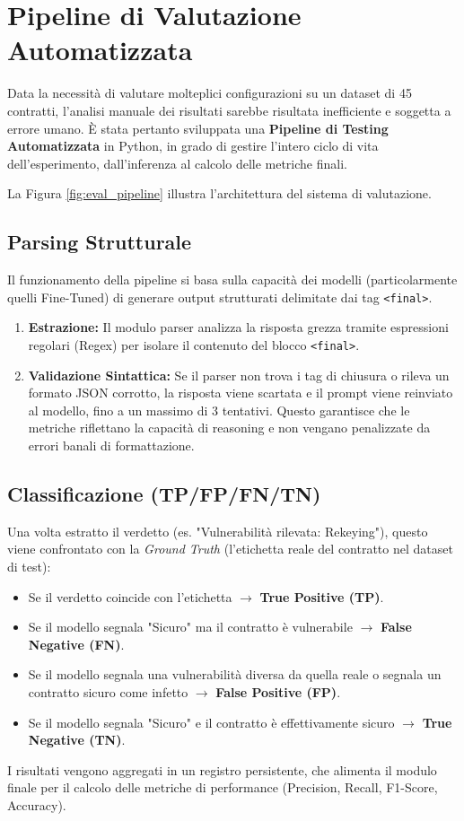 \section{Pipeline di Valutazione Automatizzata}
\label{sec:eval_pipeline}

Data la necessità di valutare molteplici configurazioni su un dataset di 45 contratti, l'analisi manuale dei risultati sarebbe risultata inefficiente e soggetta a errore umano. È stata pertanto sviluppata una \textbf{Pipeline di Testing Automatizzata} in Python, in grado di gestire l'intero ciclo di vita dell'esperimento, dall'inferenza al calcolo delle metriche finali.

La Figura \ref{fig:eval_pipeline} illustra l'architettura del sistema di valutazione.

\subsection{Parsing Strutturale}
Il funzionamento della pipeline si basa sulla capacità dei modelli (particolarmente quelli Fine-Tuned) di generare output strutturati delimitate dai tag \texttt{<final>}.
\begin{enumerate}
    \item \textbf{Estrazione:} Il modulo parser analizza la risposta grezza tramite espressioni regolari (Regex) per isolare il contenuto del blocco \texttt{<final>}.
    \item \textbf{Validazione Sintattica:} Se il parser non trova i tag di chiusura o rileva un formato JSON corrotto, la risposta viene scartata e il prompt viene reinviato al modello, fino a un massimo di 3 tentativi. Questo garantisce che le metriche riflettano la capacità di reasoning e non vengano penalizzate da errori banali di formattazione.
\end{enumerate}

\subsection{Classificazione (TP/FP/FN/TN)}
Una volta estratto il verdetto (es. "Vulnerabilità rilevata: Rekeying"), questo viene confrontato con la \textit{Ground Truth} (l'etichetta reale del contratto nel dataset di test):
\begin{itemize}
    \item Se il verdetto coincide con l'etichetta $\rightarrow$ \textbf{True Positive (TP)}.
    \item Se il modello segnala "Sicuro" ma il contratto è vulnerabile $\rightarrow$ \textbf{False Negative (FN)}.
    \item Se il modello segnala una vulnerabilità diversa da quella reale o segnala un contratto sicuro come infetto $\rightarrow$ \textbf{False Positive (FP)}.
    \item Se il modello segnala "Sicuro" e il contratto è effettivamente sicuro $\rightarrow$ \textbf{True Negative (TN)}.
\end{itemize}
I risultati vengono aggregati in un registro persistente, che alimenta il modulo finale per il calcolo delle metriche di performance (Precision, Recall, F1-Score, Accuracy).


